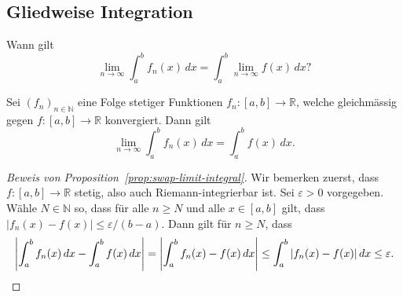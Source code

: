 \documentclass[../main.tex]{subfiles}
\begin{document}




\subsection*{Gliedweise Integration}
\begin{question}
  Wann gilt
  \[
    \lim_{n \to \infty} \int_{a}^{b} f_n(x) \, dx = \int_{a}^{b} \lim_{n \to \infty} f(x)\, dx?
  \]
\end{question}

\begin{proposition}\label{prop:swap-limit-integral}
  Sei ${(f_{n})}_{n \in \mathbb{N}}$ eine Folge stetiger Funktionen
  $f_n \colon [a, b] \to \mathbb{R}$, welche gleichmässig
  gegen $f \colon[a, b] \to \mathbb{R}$ konvergiert. Dann gilt
  \[
    \lim_{n \to \infty} \int_{a}^{b} f_n(x) \, dx = \int_{a}^{b} f(x) \, dx.
  \]
\end{proposition}

\begin{proof}[Beweis von Proposition~\ref{prop:swap-limit-integral}]
  Wir bemerken zuerst, dass $f \colon [a, b] \to \mathbb{R}$ stetig, also auch
  Riemann-integrierbar ist.
  Sei $\varepsilon > 0$ vorgegeben.
  Wähle $N \in \mathbb{N}$ so, dass für alle $n \geq N$ und alle $x \in [a, b]$ gilt,
  dass
  $|f_n(x) - f(x)| \leq \varepsilon/(b-a)$.
  Dann gilt für $n \geq N$, dass
  \[
     \left| \int_{a}^{b} f_n(x) \, dx - \int_{a}^{b} f(x) \, dx\right|  
     = \left| \int_{a}^{b} f_n(x) - f(x) \, dx \right|  
     \leq \int_{a}^{b} |f_n(x) - f(x)| \, dx \leq \varepsilon.\qedhere
  \]
\end{proof}
\end{document}
